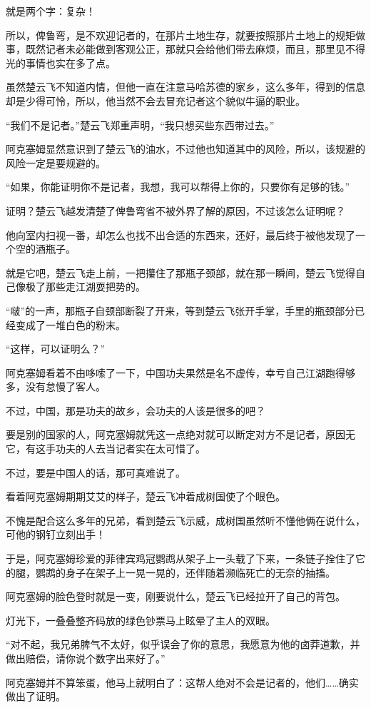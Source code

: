 就是两个字：复杂！

所以，俾鲁弯，是不欢迎记者的，在那片土地生存，就要按照那片土地上的规矩做事，既然记者未必能做到客观公正，那就只会给他们带去麻烦，而且，那里见不得光的事情也实在多了点。

虽然楚云飞不知道内情，但他一直在注意马哈苏德的家乡，这么多年，得到的信息却是少得可怜，所以，他当然不会去冒充记者这个貌似牛逼的职业。

“我们不是记者。”楚云飞郑重声明，“我只想买些东西带过去。”

阿克塞姆显然意识到了楚云飞的油水，不过他也知道其中的风险，所以，该规避的风险一定是要规避的。

“如果，你能证明你不是记者，我想，我可以帮得上你的，只要你有足够的钱。”

证明？楚云飞越发清楚了俾鲁弯省不被外界了解的原因，不过该怎么证明呢？

他向室内扫视一番，却怎么也找不出合适的东西来，还好，最后终于被他发现了一个空的酒瓶子。

就是它吧，楚云飞走上前，一把攥住了那瓶子颈部，就在那一瞬间，楚云飞觉得自己像极了那些走江湖耍把势的。

“啵”的一声，那瓶子自颈部断裂了开来，等到楚云飞张开手掌，手里的瓶颈部分已经变成了一堆白色的粉末。

“这样，可以证明么？”

阿克塞姆看着不由哆嗦了一下，中国功夫果然是名不虚传，幸亏自己江湖跑得够多，没有怠慢了客人。

不过，中国，那是功夫的故乡，会功夫的人该是很多的吧？

要是别的国家的人，阿克塞姆就凭这一点绝对就可以断定对方不是记者，原因无它，有这手功夫的人去当记者实在太可惜了。

不过，要是中国人的话，那可真难说了。

看着阿克塞姆期期艾艾的样子，楚云飞冲着成树国使了个眼色。

不愧是配合这么多年的兄弟，看到楚云飞示威，成树国虽然听不懂他俩在说什么，可他的钢钉立刻出手！

于是，阿克塞姆珍爱的菲律宾鸡冠鹦鹉从架子上一头载了下来，一条链子拴住了它的腿，鹦鹉的身子在架子上一晃一晃的，还伴随着濒临死亡的无奈的抽搐。

阿克塞姆的脸色登时就是一变，刚要说什么，楚云飞已经拉开了自己的背包。

灯光下，一叠叠整齐码放的绿色钞票马上眩晕了主人的双眼。

“对不起，我兄弟脾气不太好，似乎误会了你的意思，我愿意为他的卤莽道歉，并做出赔偿，请你说个数字出来好了。”

阿克塞姆并不算笨蛋，他马上就明白了：这帮人绝对不会是记者的，他们……确实做出了证明。

